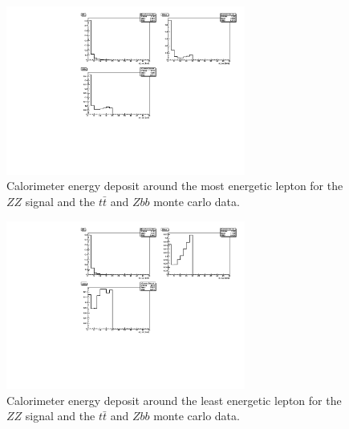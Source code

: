 \documentclass[twoside,        %
               BCOR12mm,       %
               ngerman,english, %
               fleqn,headsepline=false,footsepline=false
              ]{Vorlage/MFPREPORT}
\begin{document}
\begin{figure}[h!]
    \begin{center}
        \includegraphics[width=0.7\textwidth]{ZZ/etiso1_uncut}
    \end{center}
    \caption{Calorimeter energy deposit around the most energetic lepton for
    the $ZZ$ signal and the $t\bar t$ and $Zbb$
    monte carlo data.}
    \label{fig:cut2}
\end{figure}
\begin{figure}[h!]
    \begin{center}
        \includegraphics[width=0.7\textwidth]{ZZ/etiso4_uncut}
    \end{center}
    \caption{Calorimeter energy deposit around the least energetic lepton for
    the $ZZ$ signal and the $t\bar t$ and $Zbb$
    monte carlo data.}
    \label{fig:cut3}
\end{figure}
\end{document}
